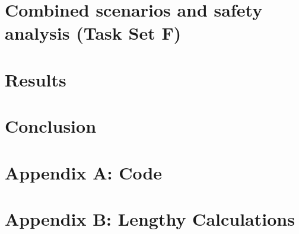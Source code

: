 \documentclass[12pt]{article}
\begin{document}
\subsubsection{}

\section{Combined scenarios and safety analysis (Task Set F)}
\subsection{}
\subsubsection{}

\section{Results}
\subsection{}
\subsubsection{}

\section{Conclusion}
\subsection{}
\subsubsection{}

\clearpage
\appendix
\section{Appendix A: Code}
\subsection{}
\subsubsection{}


\section{Appendix B: Lengthy Calculations}
\subsection{}
\subsubsection{}
\end{document}
